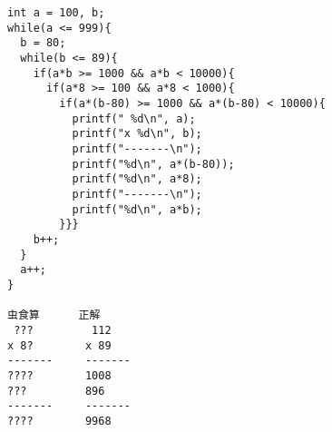 \documentclass[a4j]{jarticle}
\begin{document}
\begin{multicols*}{2}
\ifnum {}
\begin{verbatim}





















\end{verbatim}
\else
\begin{verbatim}
int a = 100, b;
while(a <= 999){
  b = 80;
  while(b <= 89){
    if(a*b >= 1000 && a*b < 10000){
      if(a*8 >= 100 && a*8 < 1000){
        if(a*(b-80) >= 1000 && a*(b-80) < 10000){
          printf(" %d\n", a);
          printf("x %d\n", b);
          printf("-------\n");
          printf("%d\n", a*(b-80));
          printf("%d\n", a*8);
          printf("-------\n");
          printf("%d\n", a*b);
        }}}
    b++;
  }
  a++;
}

虫食算      正解
 ???         112  
x 8?        x 89  
-------     -------
????        1008  
???         896   
-------     -------
????        9968   
\end{verbatim}
\fi









%
%
%
%
%
%
%
%
%
%
%
%
%
%













\end{multicols*}
\end{document}
